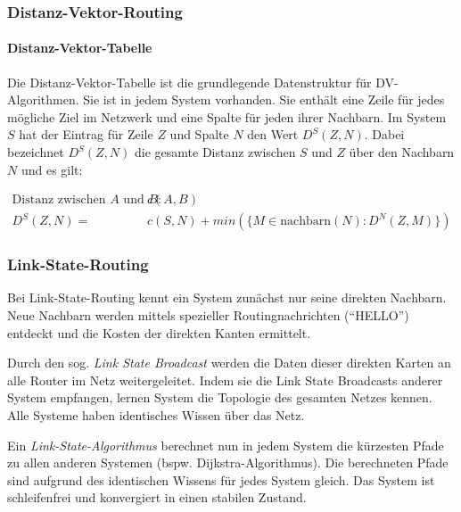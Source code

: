 \documentclass[a4paper, 14pt]{article}
\begin{document}
	\subsubsection{Distanz-Vektor-Routing}

	\paragraph{Distanz-Vektor-Tabelle}

	Die Distanz-Vektor-Tabelle ist die grundlegende Datenstruktur für DV-Algorithmen.
	Sie ist in jedem System vorhanden.
	Sie enthält eine Zeile für jedes mögliche Ziel im Netzwerk und eine Spalte für jeden ihrer Nachbarn.
	Im System $S$ hat der Eintrag für Zeile $Z$ und Spalte $N$ den Wert $D^S(Z, N)$.
	Dabei bezeichnet $D^S(Z, N)$ die gesamte Distanz zwischen $S$ und $Z$ über den Nachbarn $N$ und es gilt:

	\begin{align*}
		\text{Distanz zwischen $A$ und $B$: } &c(A, B) \\
		D^S(Z, N) = &c(S, N) + min(\{ M \in \text{nachbarn}(N) : D^N(Z, M) \})
	\end{align*}


	\subsubsection{Link-State-Routing}

	Bei Link-State-Routing kennt ein System zunächst nur seine direkten Nachbarn.
	Neue Nachbarn werden mittels spezieller Routingnachrichten (\enquote{HELLO}) entdeckt und die Kosten der direkten Kanten ermittelt.

	Durch den sog. \emph{Link State Broadcast} werden die Daten dieser direkten Karten an alle Router im Netz weitergeleitet.
	Indem sie die Link State Broadcasts anderer System empfangen, lernen System die Topologie des gesamten Netzes kennen.
	Alle Systeme haben identisches Wissen über das Netz.

	Ein \emph{Link-State-Algorithmus} berechnet nun in jedem System die kürzesten Pfade zu allen anderen Systemen (bspw. Dijkstra-Algorithmus).
	Die berechneten Pfade sind aufgrund des identischen Wissens für jedes System gleich.
	Das System ist schleifenfrei und konvergiert in einen stabilen Zustand.
\end{document}
